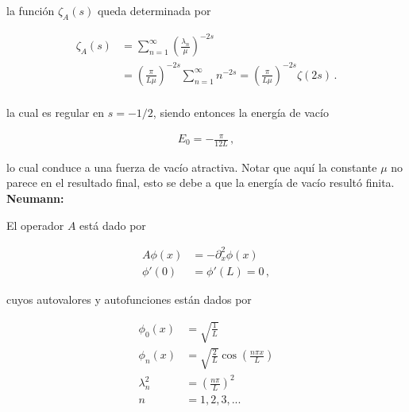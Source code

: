 la función $\zeta _A (s)$ queda determinada por

\begin{equation}
\begin{aligned}
\zeta _A (s) &= 
\sum _{n=1} ^{\infty} \left( \frac{\lambda _n}{\mu} \right) ^{-2s}  \\[10pt]
&= \left(  \frac{\pi}{L \mu} \right) ^{-2s}   \sum _{n=1} ^{\infty} n ^{-2s} = 
\left( \frac{\pi}{L \mu} \right) ^{-2s}  \zeta (2s) \, . \\[10pt]
\end{aligned}
\end{equation}


la cual es regular en $s=-1/2$, siendo entonces la energía de vacío

\begin{equation}
\begin{array}{c}
E _0 = - \frac{\pi}{12 L} \, ,
\end{array}
\end{equation}

lo cual conduce a una fuerza de vacío atractiva. Notar que aquí la constante $\mu$ no parece en el resultado final, esto se debe a que la energía de vacío resultó finita.\\

\textbf{Neumann:}

El operador $A$ está dado por

\begin{equation}
\begin{aligned}
	A \phi (x) &= - \partial _x ^2 \phi (x) \\[10pt]
    \phi ' (0) &= \phi ' (L) = 0 \, ,
\end{aligned}
\end{equation}



cuyos autovalores y autofunciones están dados por

\begin{equation}
\begin{aligned}
	\phi _0 (x) &= \sqrt{ \frac{1}{L} } \\[5pt]
	\phi _n (x)  &= \sqrt{\frac{2}{L}} \cos \left( \frac{n \pi x}{L} \right) \\[5pt]
	\lambda _n ^2 &= \left( \frac{n \pi }{L} \right) ^2 \\[5pt]
	n &= 1,2,3, ...
\end{aligned}
\end{equation}



